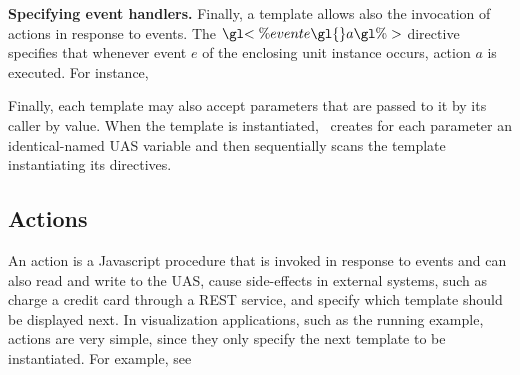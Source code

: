 
{\bf Specifying event handlers.} Finally, a template allows also the invocation of actions in response to events. The $\gl{<\% event } e \gl{ } a \gl{ \%>}$ directive specifies that whenever event $e$ of the enclosing unit instance occurs, action $a$ is executed. For instance, \\

\costas{}

Finally, each template may also accept parameters that are passed to it by its caller by value. When the template is instantiated, \projname\ creates for each parameter an identical-named UAS variable and then sequentially scans the template instantiating its directives.

\subsection{Actions}
An action is a Javascript procedure that is invoked in response to events and can also read and write to the UAS, cause side-effects in external systems, such as charge a credit card through a REST service, and specify which template should be displayed next. In visualization applications, such as the running example, actions are very simple, since they only specify the next template to be instantiated. For example, see   

